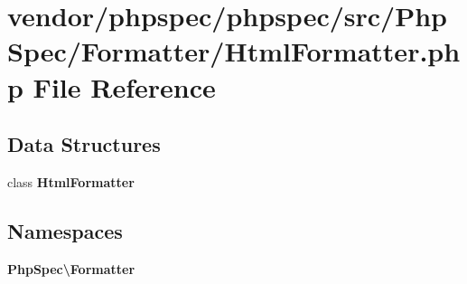 \section{vendor/phpspec/phpspec/src/\+Php\+Spec/\+Formatter/\+Html\+Formatter.php File Reference}
\label{phpspec_2phpspec_2src_2_php_spec_2_formatter_2_html_formatter_8php}
\subsection*{Data Structures}
\begin{DoxyCompactItemize}
\item 
class {\bf Html\+Formatter}
\end{DoxyCompactItemize}
\subsection*{Namespaces}
\begin{DoxyCompactItemize}
\item 
 {\bf Php\+Spec\textbackslash{}\+Formatter}
\end{DoxyCompactItemize}
